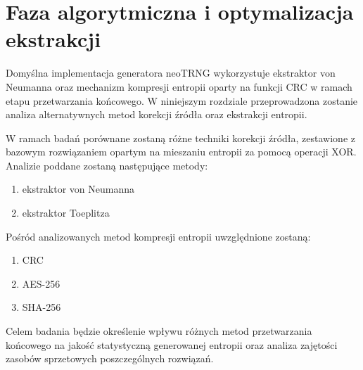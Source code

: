 
\chapter{Faza algorytmiczna i optymalizacja ekstrakcji}

\noindent Domyślna implementacja generatora neoTRNG wykorzystuje ekstraktor von 
Neumanna oraz mechanizm kompresji entropii oparty na funkcji CRC w ramach etapu 
przetwarzania końcowego. W niniejszym rozdziale przeprowadzona zostanie analiza 
alternatywnych metod korekcji źródła oraz ekstrakcji entropii.

W ramach badań porównane zostaną różne techniki korekcji źródła, zestawione z 
bazowym rozwiązaniem opartym na mieszaniu entropii za pomocą operacji XOR. 
Analizie poddane zostaną następujące metody:

\begin{enumerate}
    \item ekstraktor von Neumanna
    \item ekstraktor Toeplitza
\end{enumerate}

Pośród analizowanych metod kompresji entropii uwzględnione zostaną:

\begin{enumerate}
    \item CRC
    \item AES-256
    \item SHA-256
\end{enumerate}

Celem badania będzie określenie wpływu różnych metod przetwarzania końcowego na 
jakość statystyczną generowanej entropii oraz analiza zajętości zasobów sprzetowych 
poszczególnych rozwiązań.